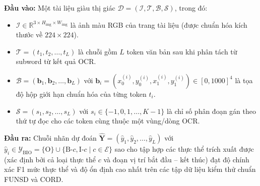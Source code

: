\noindent\textbf{Đầu vào:} Một tài liệu giàu thị giác $\mathcal{D} = (\mathcal{I}, \mathcal{T}, \mathcal{B}, \mathcal{S})$, trong đó:
\begin{itemize}
    \item $\mathcal{I} \in \mathbb{R}^{3 \times H_{\text{img}} \times W_{\text{img}}}$ là ảnh màu RGB của trang tài liệu (được chuẩn hóa kích thước về $224 \times 224$).
    \item $\mathcal{T} = (t_1, t_2, \dots, t_L)$ là chuỗi gồm $L$ token văn bản sau khi phân tách từ subword từ kết quả OCR.
    \item $\mathcal{B} = (\mathbf{b}_1, \mathbf{b}_2, \dots, \mathbf{b}_L)$ với $\mathbf{b}_i = (x_0^{(i)}, y_0^{(i)}, x_1^{(i)}, y_1^{(i)}) \in [0, 1000]^4$ là tọa độ hộp giới hạn chuẩn hóa của từng token $t_i$.
    \item $\mathcal{S} = (s_1, s_2, \dots, s_L)$ với $s_i \in \{-1, 0, 1, \dots, K-1\}$ là chỉ số phân đoạn gán theo thứ tự đọc cho các token cùng thuộc một vùng/dòng OCR.
\end{itemize}

\noindent\textbf{Đầu ra:} Chuỗi nhãn dự đoán $\hat{\mathbf{Y}} = (\hat{y}_1, \hat{y}_2, \dots, \hat{y}_L)$ với $\hat{y}_i \in \mathcal{Y}_{\text{BIO}} = \{\text{O}\} \cup \{\text{B-}c, \text{I-}c \mid c \in \mathcal{E}\}$ sao cho tập hợp các thực thể trích xuất được (xác định bởi cả loại thực thể $c$ và đoạn vị trí bắt đầu -- kết thúc) đạt độ chính xác F1 mức thực thể và độ ổn định cao nhất trên các tập dữ liệu kiểm thử chuẩn FUNSD và CORD.

